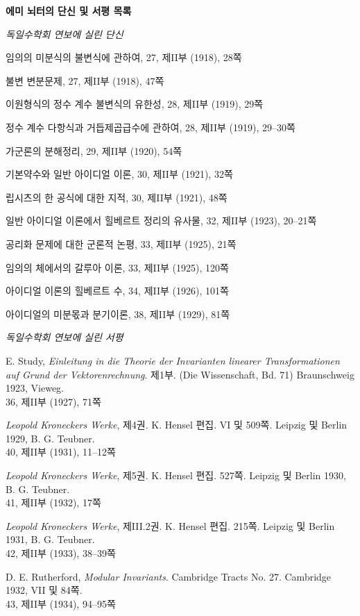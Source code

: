\clearpage
\begin{center}
{\Large\bfseries 에미 뇌터의 단신 및 서평 목록}
\end{center}

\begin{center}
\emph{독일수학회 연보에 실린 단신}
\end{center}

\begingroup
\setlength{\parindent}{0pt}
\setlength{\parskip}{0.15em}
임의의 미분식의 불변식에 관하여, 27, 제II부 (1918), 28쪽\par
불변 변분문제, 27, 제II부 (1918), 47쪽\par
이원형식의 정수 계수 불변식의 유한성, 28, 제II부 (1919), 29쪽\par
정수 계수 다항식과 거듭제곱급수에 관하여, 28, 제II부 (1919), 29--30쪽\par
가군론의 분해정리, 29, 제II부 (1920), 54쪽\par
기본약수와 일반 아이디얼 이론, 30, 제II부 (1921), 32쪽\par
립시츠의 한 공식에 대한 지적, 30, 제II부 (1921), 48쪽\par
일반 아이디얼 이론에서 힐베르트 정리의 유사물, 32, 제II부 (1923), 20--21쪽\par
공리화 문제에 대한 군론적 논평, 33, 제II부 (1925), 21쪽\par
임의의 체에서의 갈루아 이론, 33, 제II부 (1925), 120쪽\par
아이디얼 이론의 힐베르트 수, 34, 제II부 (1926), 101쪽\par
아이디얼의 미분몫과 분기이론, 38, 제II부 (1929), 81쪽\par
\endgroup

\begin{center}
\emph{독일수학회 연보에 실린 서평}
\end{center}

\begingroup
\setlength{\parindent}{0pt}
\setlength{\parskip}{0.35em}
E. Study, \emph{Einleitung in die Theorie der Invarianten linearer Transformationen auf Grund der Vektorenrechnung}. 제1부. (Die Wissenschaft, Bd. 71) Braunschweig 1923, Vieweg.\\
36, 제II부 (1927), 71쪽\par
\emph{Leopold Kroneckers Werke}, 제4권. K. Hensel 편집. VI 및 509쪽. Leipzig 및 Berlin 1929, B. G. Teubner.\\
40, 제II부 (1931), 11--12쪽\par
\emph{Leopold Kroneckers Werke}, 제5권. K. Hensel 편집. 527쪽. Leipzig 및 Berlin 1930, B. G. Teubner.\\
41, 제II부 (1932), 17쪽\par
\emph{Leopold Kroneckers Werke}, 제III.2권. K. Hensel 편집. 215쪽. Leipzig 및 Berlin 1931, B. G. Teubner.\\
42, 제II부 (1933), 38--39쪽\par
D. E. Rutherford, \emph{Modular Invariants}. Cambridge Tracts No. 27. Cambridge 1932, VII 및 84쪽.\\
43, 제II부 (1934), 94--95쪽\par
\endgroup

